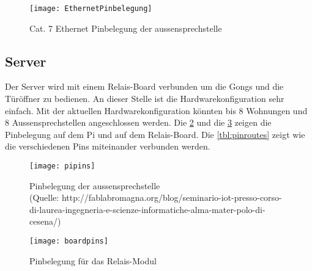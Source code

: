 \begin{figure}[htb!]
	\begin{center}
		\texttt{[image: EthernetPinbelegung]}
		\caption[EthernetPinbelegung]{Cat. 7 Ethernet Pinbelegung der \gls{aussensprechstelle}}
		\label{fig:ethernetBelegung}
	\end{center}
\end{figure}



\subsection{Server}
\label{sec:chapterexample}
Der Server wird mit einem Relais-Board verbunden um die Gongs und die Türöffner zu bedienen. An dieser Stelle ist die Hardwarekonfiguration sehr einfach. Mit der aktuellen Hardwarekonfiguration könnten bis 8 Wohnungen und 8 Aussensprechstellen angeschlossen werden. Die \cref{fig:pipins} und die \cref{fig:boardpins} zeigen die Pinbelegung auf dem Pi und auf dem Relais-Board. Die \cref{tbl:pinroutes} zeigt wie die verschiedenen Pins miteinander verbunden werden.

\begin{figure}[htb!]
	\begin{center}
		\texttt{[image: pipins]}
		\caption[EthernetPinbelegung]{Pinbelegung der \gls{aussensprechstelle} \\
			(Quelle: http://fablabromagna.org/blog/seminario-iot-presso-corso-di-laurea-ingegneria-e-scienze-informatiche-alma-mater-polo-di-cesena/)}
		\label{fig:pipins}
	\end{center}
\end{figure}

\begin{figure}[htb!]
	\begin{center}
		\texttt{[image: boardpins]}
		\caption[EthernetPinbelegung]{Pinbelegung für das Relais-Modul}
		\label{fig:boardpins}
	\end{center}
\end{figure}

